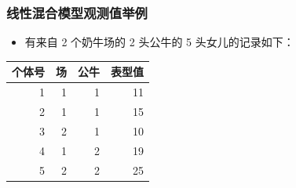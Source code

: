 \documentclass[serif,aspectratio=169]{beamer}
\begin{document}
\begin{frame}
  \frametitle{线性混合模型观测值举例}
  \begin{itemize}
  \item 有来自 2 个奶牛场的 2 头公牛的 5 头女儿的记录如下：
  \end{itemize}
  \centering
  \begin{tabular}{rrrr}
    个体号 & 场 & 公牛 & 表型值\\\hline
    1 & 1 & 1 & 11\\
    2 & 1 & 1 & 15\\
    3 & 2 & 1 & 10\\
    4 & 1 & 2 & 19\\
    5 & 2 & 2 & 25
  \end{tabular}
\end{frame}
\end{document}
